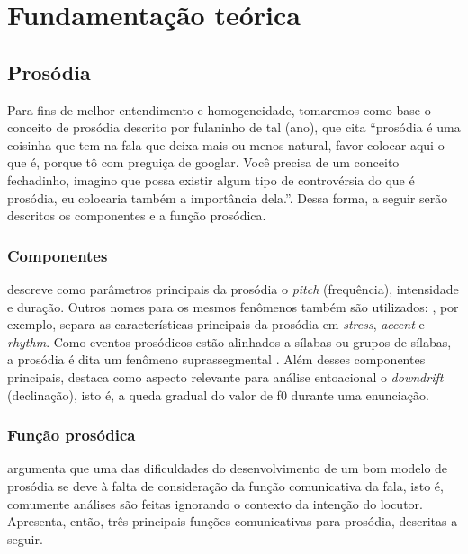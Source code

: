 
\chapter{Fundamentação teórica}

\section{Prosódia}
Para fins de melhor entendimento e homogeneidade, tomaremos como base o conceito
de prosódia descrito por fulaninho de tal (ano), que cita “prosódia é uma
coisinha que tem na fala que deixa mais ou menos natural, favor colocar aqui o
que é, porque tô com preguiça de googlar. Você precisa de um conceito
fechadinho, imagino que possa existir algum tipo de controvérsia do que é
prosódia, eu colocaria também a importância dela.”. Dessa forma, a seguir serão
descritos os componentes e a função prosódica.

\subsection{Componentes}
 descreve como parâmetros principais da prosódia o
\emph{pitch} (frequência), intensidade e duração. Outros nomes para os mesmos
fenômenos também são utilizados: , por exemplo, separa as
características principais da prosódia em \emph{stress}, \emph{accent} e
\emph{rhythm}. Como eventos prosódicos estão alinhados a sílabas ou grupos de
sílabas, a prosódia é dita um fenômeno suprassegmental \cite{ladd}. Além desses
componentes principais,  destaca como aspecto relevante
para análise entoacional o \emph{downdrift} (declinação), isto é, a queda
gradual do valor de f0 durante uma enunciação.


\subsection{Função prosódica}
 argumenta que uma das dificuldades do desenvolvimento de
um bom modelo de prosódia se deve à falta de consideração da função
comunicativa da fala, isto é, comumente análises são feitas ignorando o contexto
da intenção do locutor. Apresenta, então, três principais funções comunicativas
para prosódia, descritas a seguir.

